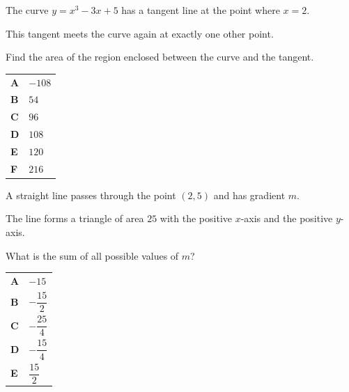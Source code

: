 \documentclass[11pt,a4paper]{article}
\begin{document}
\begin{enumerate}[label=\textbf{\arabic*.},leftmargin=*,itemsep=0pt,start=5]
\questionitem[Integration]
The curve $y = x^3 - 3x + 5$ has a tangent line at the point where $x = 2$. 

This tangent meets the curve again at exactly one other point. 

Find the area of the region enclosed between the curve and the tangent.

\par\vspace*{12pt}
\begin{tabularx}{\linewidth}{@{}>{\bfseries}l Y@{}}
A &
$-108$
\\[0.8em]
B &
$54$
\\[0.8em]
C &
$96$
\\[0.8em]
D &
$108$
\\[0.8em]
E &
$120$
\\[0.8em]
F &
$216$
\\
\end{tabularx}
\end{enumerate}
\clearpage
\thispagestyle{djspaper}
\vspace*{8pt}
\begin{enumerate}[label=\textbf{\arabic*.},leftmargin=*,itemsep=0pt,start=6]
A straight line passes through the point $(2, 5)$ and has gradient $m$.

The line forms a triangle of area $25$ with the positive $x$-axis and the positive $y$-axis.

What is the sum of all possible values of $m$?

\par\vspace*{12pt}
\begin{tabularx}{\linewidth}{@{}>{\bfseries}l Y@{}}
A &
$-15$
\\[0.8em]
B &
$-\dfrac{15}{2}$
\\[0.8em]
C &
$-\dfrac{25}{4}$
\\[0.8em]
D &
$-\dfrac{15}{4}$
\\[0.8em]
E &
$\dfrac{15}{2}$
\\
\end{tabularx}
\end{enumerate}
\end{document}

